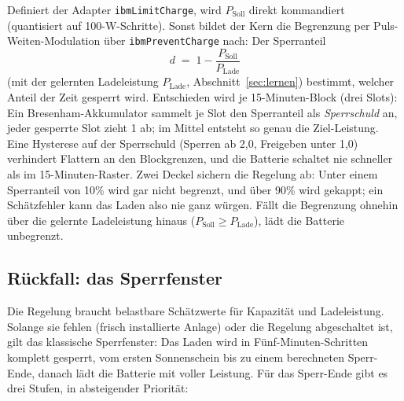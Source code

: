 \documentclass[11pt,a4paper]{article}
\newcommand{\code}[1]{\texttt{#1}}
\begin{document}
Definiert der Adapter \code{ibmLimitCharge}, wird $P_{\text{Soll}}$ direkt
kommandiert (quantisiert auf 100-W-Schritte). Sonst bildet der Kern die
Begrenzung per Puls-Weiten-Modulation über \code{ibmPreventCharge} nach:
Der Sperranteil
\begin{equation}
  d \;=\; 1 - \frac{P_{\text{Soll}}}{P_{\text{Lade}}}
  \label{eq:duty}
\end{equation}
(mit der gelernten Ladeleistung $P_{\text{Lade}}$,
Abschnitt~\ref{sec:lernen}) bestimmt, welcher Anteil der Zeit gesperrt
wird. Entschieden wird je 15-Minuten-Block (drei Slots): Ein
Bresenham-Akkumulator sammelt je Slot den Sperranteil als
\emph{Sperrschuld} an, jeder gesperrte Slot zieht 1 ab; im Mittel entsteht
so genau die Ziel-Leistung. Eine Hysterese auf der Sperrschuld (Sperren ab
2,0, Freigeben unter 1,0) verhindert Flattern an den Blockgrenzen, und die
Batterie schaltet nie schneller als im 15-Minuten-Raster. Zwei Deckel
sichern die Regelung ab: Unter einem Sperranteil von 10\% wird gar nicht
begrenzt, und über 90\% wird gekappt; ein Schätzfehler kann das Laden also
nie ganz würgen. Fällt die Begrenzung ohnehin über die gelernte
Ladeleistung hinaus ($P_{\text{Soll}} \geq P_{\text{Lade}}$), lädt die
Batterie unbegrenzt.

\subsection{Rückfall: das Sperrfenster}\label{sec:sperrfenster}

Die Regelung braucht belastbare Schätzwerte für Kapazität und
Ladeleistung. Solange sie fehlen (frisch installierte Anlage) oder die
Regelung abgeschaltet ist, gilt das klassische Sperrfenster: Das Laden wird
in Fünf-Minuten-Schritten komplett gesperrt, vom ersten Sonnenschein bis zu
einem berechneten Sperr-Ende, danach lädt die Batterie mit voller Leistung.
Für das Sperr-Ende gibt es drei Stufen, in absteigender Priorität:
\end{document}
